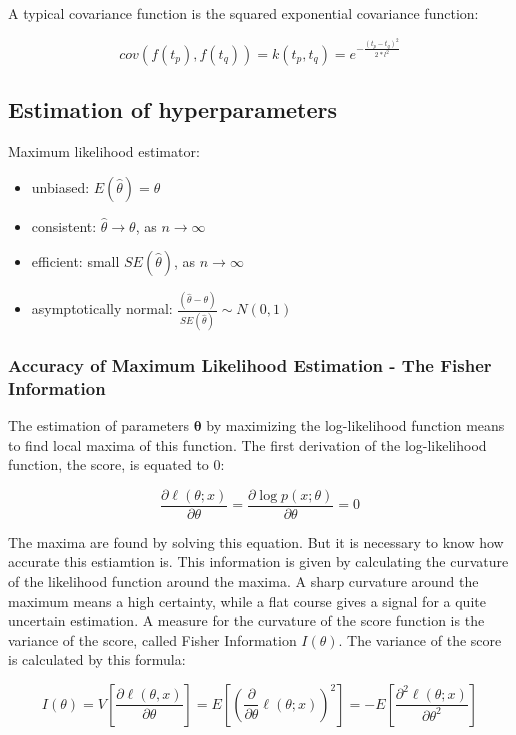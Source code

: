 \documentclass[12pt]{article}
\begin{document}
	A typical covariance function is the squared exponential covariance function:
	
	\begin{displaymath}
	cov( f(t_{p} ), f(t_{q} )) = 
	k( t_{p} , t_{q} ) = 
	e^{-\frac{(t_{p}-t_{q})^2}{2*l^2}}
	\end{displaymath}
	
	
	\subsection{Estimation of hyperparameters}
	Maximum likelihood estimator:
	\begin{itemize}
		\item unbiased: $E(\hat{\theta}) = \theta$
		\item consistent: $\hat{\theta} \rightarrow \theta$, as $n \rightarrow \infty$
		\item efficient: small $SE(\hat{\theta})$, as $n \rightarrow \infty$
		\item asymptotically normal: $\frac{(\hat{\theta}-\theta)}{SE(\hat{\theta})} \sim N(0,1)$
	\end{itemize}
	\subsubsection{Accuracy of Maximum Likelihood Estimation - The Fisher Information}
	The estimation of parameters $\bm{\theta}$ by maximizing the log-likelihood function means to find local maxima of this function. 
	The first derivation of the log-likelihood function, the score, is equated to 0:
	
	\begin{displaymath}
	\frac{\partial \ell (\theta;x)}{\partial \theta}=\frac{\partial \log p(x;\theta)}{\partial \theta} = 0
	\end{displaymath}
	
	The maxima are found by solving this equation. 
	But it is necessary to know how accurate this estiamtion is. This information is given by calculating the curvature of the likelihood function around the maxima. A sharp curvature around the maximum means a high certainty, while a flat course gives a signal for a quite uncertain estimation.
	A measure for the curvature of the score function is the variance of the score, called Fisher Information $I(\theta)$. The variance of the score is calculated by this formula:
	
	\begin{displaymath}
	I(\theta)=
	V[\frac{\partial \ell (\theta,x)}{\partial \theta}]=
	E[(\frac{\partial}{\partial\theta}\ell(\theta;x))^{2}]=	
	-E[\frac{\partial^{2} \ell (\theta;x)}{\partial \theta^{2}}]
	\end{displaymath}
	
\end{document}

